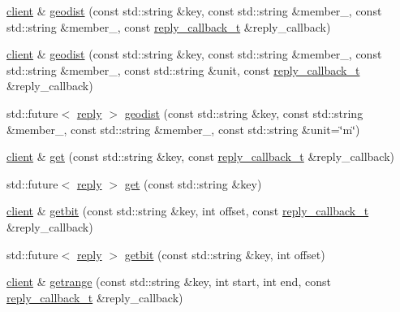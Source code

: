 \begin{DoxyCompactItemize}
\item 
\hyperlink{classcpp__redis_1_1client}{client} \& \hyperlink{classcpp__redis_1_1client_a56df27bbe73c7738854150359ba39958}{geodist} (const std\+::string \&key, const std\+::string \&member\+\_, const std\+::string \&member\+\_, const \hyperlink{classcpp__redis_1_1client_a061a1140d36d2eaeda82b09a0bb3f9f2}{reply\+\_\+callback\+\_\+t} \&reply\+\_\+callback)
\item 
\hyperlink{classcpp__redis_1_1client}{client} \& \hyperlink{classcpp__redis_1_1client_ade755123f2de81995df6a66a363a0dfb}{geodist} (const std\+::string \&key, const std\+::string \&member\+\_, const std\+::string \&member\+\_, const std\+::string \&unit, const \hyperlink{classcpp__redis_1_1client_a061a1140d36d2eaeda82b09a0bb3f9f2}{reply\+\_\+callback\+\_\+t} \&reply\+\_\+callback)
\item 
std\+::future$<$ \hyperlink{classcpp__redis_1_1reply}{reply} $>$ \hyperlink{classcpp__redis_1_1client_a32c21dc5c2b8187c33e22e695c2f1555}{geodist} (const std\+::string \&key, const std\+::string \&member\+\_, const std\+::string \&member\+\_, const std\+::string \&unit=\char`\"{}m\char`\"{})
\item 
\hyperlink{classcpp__redis_1_1client}{client} \& \hyperlink{classcpp__redis_1_1client_a1521d8c4c751d970c446aae7ccf8cc35}{get} (const std\+::string \&key, const \hyperlink{classcpp__redis_1_1client_a061a1140d36d2eaeda82b09a0bb3f9f2}{reply\+\_\+callback\+\_\+t} \&reply\+\_\+callback)
\item 
std\+::future$<$ \hyperlink{classcpp__redis_1_1reply}{reply} $>$ \hyperlink{classcpp__redis_1_1client_af2f987e43e139b21df2138a541b766f8}{get} (const std\+::string \&key)
\item 
\hyperlink{classcpp__redis_1_1client}{client} \& \hyperlink{classcpp__redis_1_1client_ad57b10f052814a2a15d4687e34d2be72}{getbit} (const std\+::string \&key, int offset, const \hyperlink{classcpp__redis_1_1client_a061a1140d36d2eaeda82b09a0bb3f9f2}{reply\+\_\+callback\+\_\+t} \&reply\+\_\+callback)
\item 
std\+::future$<$ \hyperlink{classcpp__redis_1_1reply}{reply} $>$ \hyperlink{classcpp__redis_1_1client_a43caae473008353b5ddc74a8fb36298c}{getbit} (const std\+::string \&key, int offset)
\item 
\hyperlink{classcpp__redis_1_1client}{client} \& \hyperlink{classcpp__redis_1_1client_a28b3fe6983918c6fc5549f1310742df1}{getrange} (const std\+::string \&key, int start, int end, const \hyperlink{classcpp__redis_1_1client_a061a1140d36d2eaeda82b09a0bb3f9f2}{reply\+\_\+callback\+\_\+t} \&reply\+\_\+callback)

\end{DoxyCompactItemize}
